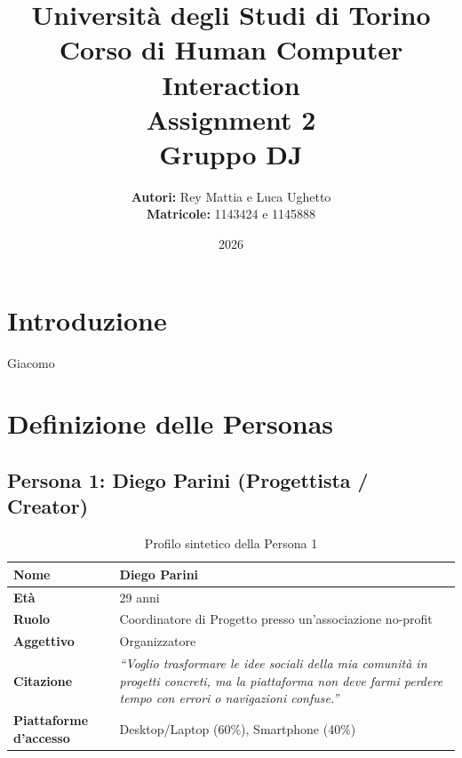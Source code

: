 \documentclass[11pt,a4paper]{article}
\title{
    \normalsize Università degli Studi di Torino \\
    \vspace{0.4cm}
    \Large \textbf{Corso di Human Computer Interaction} \\
    \vspace{0.3cm}
    \huge \textbf{Assignment 2}\\
    \Large \textbf{Gruppo DJ}
}
\author{
    \textbf{Autori:} Rey Mattia e Luca Ughetto \\
    \textbf{Matricole:}  1143424 e 1145888  \\
}
\date{2026}
\begin{document}
    \maketitle
    \thispagestyle{empty}

    \vspace{0.5cm}
    \begin{abstract}
        \noindent

    \end{abstract}

    \newpage
    \tableofcontents
    \newpage

    \section{Introduzione}
    Giacomo

    \section{Definizione delle Personas}

\subsection{Persona 1: Diego Parini (Progettista / Creator)}

\begin{table}[h!]
\centering
\small
\begin{tabular}{|p{3.5cm}|p{11.5cm}|}
\hline
\textbf{Nome} & Diego Parini \\ \hline
\textbf{Età} & 29 anni \\ \hline
\textbf{Ruolo} & Coordinatore di Progetto presso un'associazione no-profit \\ \hline
\textbf{Aggettivo} & Organizzatore \\ \hline
\textbf{Citazione} & \textit{``Voglio trasformare le idee sociali della mia comunità in progetti concreti, ma la piattaforma non deve farmi perdere tempo con errori o navigazioni confuse.''} \\ \hline
\textbf{Piattaforme d'accesso} & Desktop/Laptop (60\%), Smartphone (40\%) \\ \hline
\end{tabular}
\caption{Profilo sintetico della Persona 1}
\label{tab:persona1}
\end{table}
\end{document}
